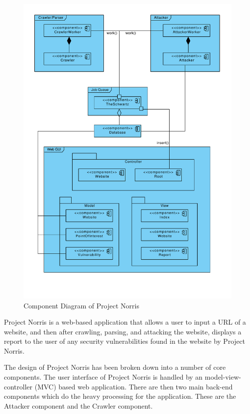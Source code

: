 \documentclass[12pt,a4paper]{article}
\begin{document}
\begin{figure}[!ht]
    \begin{center}
        \includegraphics[scale=0.7]{images/overview_component_diagram.pdf}    
    \end{center}
    \caption{Component Diagram of Project Norris}
    \label{fig:overview}
\end{figure}

Project Norris is a web-based application that allows a user to input a URL of a website, and then after crawling, parsing, and attacking the website, displays a report to the user of any security vulnerabilities found in the website by Project Norris.

The design of Project Norris has been broken down into a number of core components.  The user interface of Project Norris is handled by an model-view-controller (MVC) based web application.  There are then two main back-end components which do the heavy processing for the application.  These are the Attacker component and the Crawler component.
\end{document}
